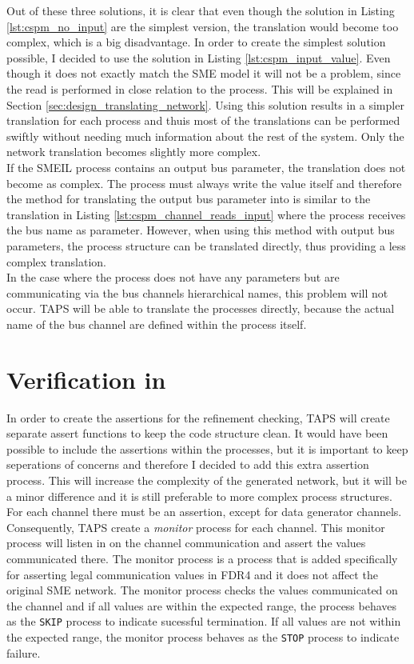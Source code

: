 Out of these three solutions, it is clear that even though the solution in Listing \ref{lst:cspm_no_input} are the simplest version, the translation would become too complex, which is a big disadvantage. In order to create the simplest solution possible, I decided to use the solution in Listing \ref{lst:cspm_input_value}. Even though it does not exactly match the SME model it will not be a problem, since the read is performed in close relation to the process. This will be explained in Section \ref{sec:design_translating_network}. Using this solution results in a simpler translation for each process and thuis most of the translations can be performed swiftly without needing much information about the rest of the system. Only the network translation becomes slightly more complex.\\

If the SMEIL process contains an output bus parameter, the translation does not become as complex. The process must always write the value itself and therefore the method for translating the output bus parameter into \cspm{} is similar to the translation in Listing \ref{lst:cspm_channel_reads_input} where the process receives the bus name as parameter. However, when using this method with output bus parameters, the process structure can be translated directly, thus providing a less complex translation.\\

In the case where the process does not have any parameters but are communicating via the bus channels hierarchical names, this problem will not occur. TAPS will be able to translate the processes directly, because the actual name of the bus channel are defined within the process itself.

\section{Verification in \cspm{}}
In order to create the assertions for the refinement checking, TAPS will create separate assert functions to keep the code structure clean. It would have been possible to include the assertions within the processes, but it is important to keep seperations of concerns and therefore I decided to add this extra assertion process. This will increase the complexity of the generated \cspm{} network, but it will be a minor difference and it is still preferable to more complex process structures. For each \cspm{} channel there must be an assertion, except for data generator channels. Consequently, TAPS create a \textit{monitor} process for each channel. This monitor process will listen in on the channel communication and assert the values communicated there. The monitor process is a process that is added specifically for asserting legal communication values in FDR4 and it does not affect the original SME network. The monitor process checks the values communicated on the channel and if all values are within the expected range, the process behaves as the \texttt{SKIP} process to indicate sucessful termination. If all values are not within the expected range, the monitor process behaves as the \texttt{STOP} process to indicate failure. \\


